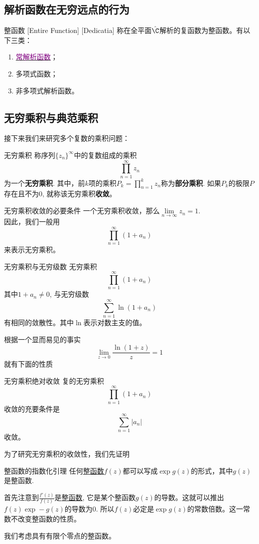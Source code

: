 \documentclass[UTF8]{ctexart}
\newcommand{\hyperrefc}[2]{\hyperref[#1]{\textcolor{purple}{#2}}}
\begin{document}
\subsection{解析函数在无穷远点的行为}
\begin{dfn}
    [EntireFunction]
    {整函数}
    [Entire Function]
    [Dedicatia]
    称在全平面$\hat{\C}$解析的复函数为整函数。有以下三类：
    \begin{enumerate}
        \item \hyperrefc{ppt:TrivialAnalyticalFunction}{常解析函数}；
        \item 多项式函数；
        \item 非多项式解析函数。
    \end{enumerate}
\end{dfn}
\subsection{无穷乘积与典范乘积}
接下来我们来研究多个复数的乘积问题：
\begin{dfn}
    {无穷乘积}
    称序列$\{z_n\}^\infty$中的复数组成的乘积
    \[\prod_{n=1}^{\infty}z_n\]
    为一个\textbf{无穷乘积}. 其中，前$k$项的乘积$P_k=\prod\limits_{n=1}^{k}z_n$称为\textbf{部分乘积}. 如果$P_k$的极限$P$存在且不为0, 就称该无穷乘积\textbf{收敛}。
\end{dfn}
\begin{ppt}
    {无穷乘积收敛的必要条件}
    一个无穷乘积收敛，那么$\lim\limits_{n\to\infty}z_n=1$.\\
    因此，我们一般用
    \[\prod_{n=1}^{\infty}(1+a_n)\]
    来表示无穷乘积。
\end{ppt}
\begin{ppt}
    {无穷乘积与无穷级数}
    无穷乘积
    \[\prod_{n=1}^{\infty}(1+a_n)\]
    其中$1+a_n\neq 0$, 与无穷级数
    \[\sum_{n=1}^\infty\ln(1+a_n)\]
    有相同的敛散性。其中$\ln$表示对数主支的值。
\end{ppt}
根据一个显而易见的事实
\[\lim_{z\to 0}\frac{\ln(1+z)}{z}=1\]
就有下面的性质
\begin{ppt}
    {无穷乘积绝对收敛}
    复的无穷乘积
    \[\prod_{n=1}^{\infty}(1+a_n)\]
    收敛的充要条件是
    \[\sum_{n=1}^\infty|a_n|\]
    收敛。
\end{ppt}
为了研究无穷乘积的收敛性，我们先证明
\begin{lma}
    {整函数的指数化引理}
    任何\hyperref[dfn:EntireFunction]{整函数}$f(z)$都可以写成$\exp g(z)$的形式，其中$g(z)$是整函数.
\end{lma}
\begin{prf}
    首先注意到$\frac{f'(z)}{f(z)}$是\hyperref[dfn:EntireFunction]{整函数}, 它是某个整函数$g(z)$的导数。这就可以推出$f(z)\exp -g(z)$的导数为0. 所以$f(z)$必定是$\exp g(z)$的常数倍数。这一常数不改变整函数的性质。
\end{prf}
我们考虑具有有限个零点的整函数。
\end{document}

